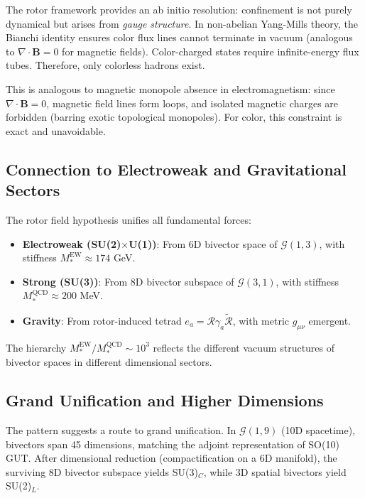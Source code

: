 \documentclass[11pt,a4paper]{article}
\newcommand{\rev}[1]{\widetilde{#1}}           %
\newcommand{\Rotor}{\mathcal{R}}
\newcommand{\Cl}{\mathcal{G}}
\theoremstyle{definition}
\theoremstyle{plain}
\theoremstyle{remark}
\begin{document}
The rotor framework provides an ab initio resolution: confinement is not purely dynamical but arises from \emph{gauge structure}. In non-abelian Yang-Mills theory, the Bianchi identity ensures color flux lines cannot terminate in vacuum (analogous to $\nabla \cdot \mathbf{B} = 0$ for magnetic fields). Color-charged states require infinite-energy flux tubes. Therefore, only colorless hadrons exist.

This is analogous to magnetic monopole absence in electromagnetism: since $\nabla \cdot \mathbf{B} = 0$, magnetic field lines form loops, and isolated magnetic charges are forbidden (barring exotic topological monopoles). For color, this constraint is exact and unavoidable.

\subsection{Connection to Electroweak and Gravitational Sectors}

The rotor field hypothesis unifies all fundamental forces:
\begin{itemize}[leftmargin=*,itemsep=3pt]
  \item \textbf{Electroweak (SU(2)$\times$U(1))}: From 6D bivector space of $\Cl(1,3)$, with stiffness $M_\ast^{\mathrm{EW}} \approx 174$ GeV.
  \item \textbf{Strong (SU(3))}: From 8D bivector subspace of $\Cl(3,1)$, with stiffness $M_\ast^{\mathrm{QCD}} \approx 200$ MeV.
  \item \textbf{Gravity}: From rotor-induced tetrad $e_a = \Rotor \gamma_a \rev{\Rotor}$, with metric $g_{\mu\nu}$ emergent.
\end{itemize}

The hierarchy $M_\ast^{\mathrm{EW}} / M_\ast^{\mathrm{QCD}} \sim 10^3$ reflects the different vacuum structures of bivector spaces in different dimensional sectors.

\subsection{Grand Unification and Higher Dimensions}

The pattern suggests a route to grand unification. In $\Cl(1,9)$ (10D spacetime), bivectors span 45 dimensions, matching the adjoint representation of SO(10) GUT. After dimensional reduction (compactification on a 6D manifold), the surviving 8D bivector subspace yields SU(3)$_C$, while 3D spatial bivectors yield SU(2)$_L$.
\end{document}
